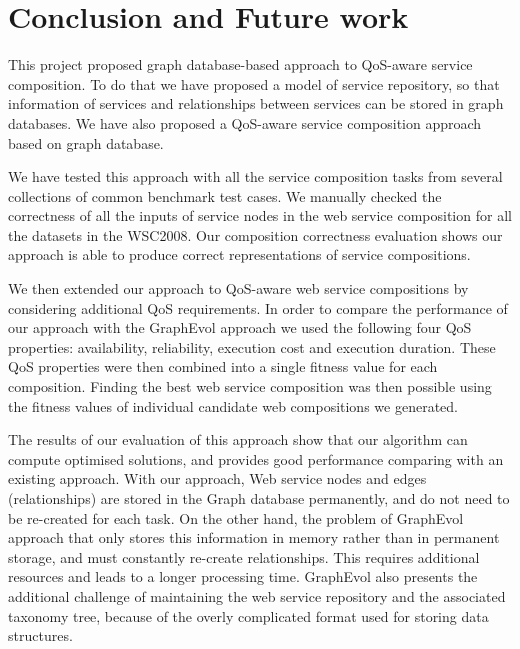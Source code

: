 \chapter{Conclusion and Future work}\label{C:conc}

This project proposed graph database-based approach to QoS-aware service composition. To do that we have proposed a model of service repository, so that information of services and relationships between services can be stored in graph databases. We have also proposed a QoS-aware service composition approach based on graph database.\par

We have tested this approach with all the service composition tasks from several collections of common benchmark test cases. We manually checked the correctness of all the inputs of service nodes in the web service composition for all the datasets in the WSC2008. Our composition correctness evaluation shows our approach is able to produce correct representations of service compositions.\par

We then extended our approach to QoS-aware web service compositions by considering additional QoS requirements. In order to compare the performance of our approach with the GraphEvol approach we used the following four QoS properties: availability, reliability, execution cost and execution duration. These QoS properties were then combined into a single fitness value for each composition. Finding the best web service composition was then possible using the fitness values of individual candidate web compositions we generated.\par

The results of our evaluation of this approach show that our algorithm can compute optimised solutions, and provides good performance comparing with an existing approach. With our approach, Web service nodes and edges (relationships) are stored in the Graph database permanently, and do not need to be re-created for each task. On the other hand, the problem of GraphEvol approach that only stores this information in memory rather than in permanent storage, and must constantly re-create relationships. This requires additional resources and leads to a longer processing time. GraphEvol also presents the additional challenge of maintaining the web service repository and the associated taxonomy tree, because of the overly complicated format used for storing data structures.\par

